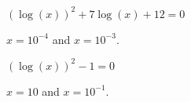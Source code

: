 \begin{exercises}
\begin{problem}
\begin{multicols}{3}
\begin{subproblem}
	\end{subproblem}
	\begin{subproblem}
		$(\log(x))^2+7\log(x)+12=0$
		\begin{shortsolution}
			$x=10^{-4}$ and $x=10^{-3}$.
		\end{shortsolution}
	\end{subproblem}
	\begin{subproblem}
		$(\log(x))^2-1=0$
		\begin{shortsolution}
			$x=10$ and $x=10^{-1}$.
		\end{shortsolution}
	\end{subproblem}
\end{multicols}
\end{problem}
\end{exercises}

